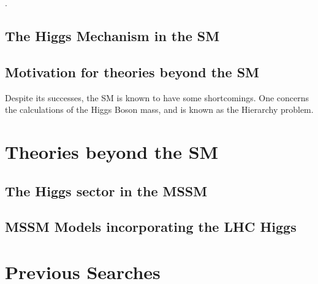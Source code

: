 \cite{GlashowPartialSymmetries,WeinbergModelOfLeptons,SalamNobelSymposium}.

\subsection{The Higgs Mechanism in the \ac{SM}}
\label{sec:SMHiggs}

\subsection{Motivation for theories beyond the \ac{SM}}

Despite its successes, the \ac{SM} is known to have some shortcomings. One concerns
the calculations of the Higgs Boson mass, and is known as the Hierarchy problem. 

\section{Theories beyond the SM}
\label{sec:BSM}

\subsection{The Higgs sector in the MSSM}

\subsection{MSSM Models incorporating the LHC Higgs}

\section{Previous Searches}




